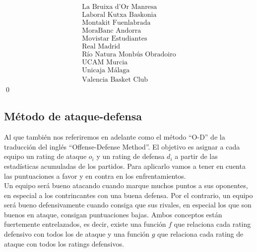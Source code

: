 \[\begin{array}{ccc}
\begin{array}{c}
	\text{La Bruixa d'Or Manresa} \\
	\text{Laboral Kutxa Baskonia} \\
	\text{Montakit Fuenlabrada} \\
	\text{MoraBanc Andorra} \\
	\text{Movistar Estudiantes} \\
	\text{Real Madrid} \\
	\text{Río Natura Monbús Obradoiro} \\
	\text{UCAM Murcia} \\
	\text{Unicaja Málaga} \\
	\text{Valencia Basket Club}
	\end{array}
	\end{array}
	\]
\qed


\subsection{Método de ataque-defensa}
Al que también nos referiremos en adelante como el método ``O-D'' de la traducción del inglés ``Offense-Defense Method''. El objetivo es asignar a cada equipo un rating de ataque $ o_{i} $ y un rating de defensa $d_{i}$ a partir de las estadísticas acumuladas de los partidos. Para aplicarlo vamos a tener en cuenta las puntuaciones a favor y en contra en los enfrentamientos.\\

Un equipo será bueno atacando cuando marque muchos puntos a sus oponentes, en especial a los contrincantes con una buena defensa. Por el contrario, un equipo será bueno defensivamente cuando consiga que sus rivales, en especial los que son buenos en ataque, consigan puntuaciones bajas. Ambos conceptos están fuertemente entrelazados, es decir, existe una función $f$ que relaciona cada rating defensivo con todos los de ataque y una función $g$ que relaciona cada rating de ataque con todos los ratings defensivos.\\

